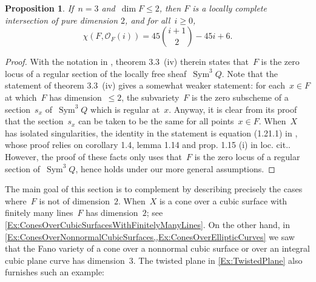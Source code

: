 \documentclass[a4paper]{amsart}
\newcommand{\cO}{\mathcal{O}}
\DeclareMathOperator{\Sym}{Sym}
\renewcommand{\le}{\leqslant}
\renewcommand{\ge}{\geqslant}
\theoremstyle{plain}
\newtheorem{proposition}[theorem]{Proposition}
\theoremstyle{definition}
\numberwithin{equation}{section}
\begin{document}
\begin{proposition}\label{Prop:HilbertPolynomial} If~$n = 3$ and~$\dim F \le 2$, then $F$ is a locally complete intersection of pure dimension $2$, and for all~$i \ge 0$,
\[ \chi(F, \cO_F(i)) =  \textstyle 45 \binom{i+1}{2} - 45 i + 6.\]
\end{proposition}

\begin{proof} With the notation in \cite{AltmanKleiman}, theorem 3.3~(iv) therein states that~$F$ is the zero locus of a regular section of the locally free sheaf~$\Sym^3 Q$. Note that the statement of theorem 3.3~(iv) gives a somewhat weaker statement: for each~$x \in F$ at which~$F$ has dimension~$\le 2$, the subvariety~$F$ is the zero subscheme of a section~$s_x$ of~$\Sym^3 Q$ which is regular at~$x$. Anyway, it is clear from its proof that the section~$s_x$ can be taken to be the same for all points~$x \in F$. When~$X$ has isolated singularities, the identity in the statement is equation (1.21.1) in \cite{AltmanKleiman}, whose proof relies on corollary 1.4, lemma 1.14 and prop. 1.15 (i) in loc. cit.. However, the proof of these facts only uses that~$F$ is the zero locus of a regular section of~$\Sym^3 Q$, hence holds under our more general assumptions.
\end{proof}

The main goal of this section is to complement \cite{AltmanKleiman} by describing precisely the cases where~$F$ is not of dimension~$2$. When~$X$ is a cone over a cubic surface with finitely many lines~$F$ has dimension~$2$; see \cref{Ex:ConesOverCubicSurfacesWithFinitelyManyLines}. On the other hand, in \cref{Ex:ConesOverNonnormalCubicSurfaces,,Ex:ConesOverEllipticCurves} we saw that the Fano variety of a cone over a nonnormal cubic surface or over an integral cubic plane curve has dimension~$3$. The twisted plane in \cref{Ex:TwistedPlane} also furnishes such an example:
\end{document}
